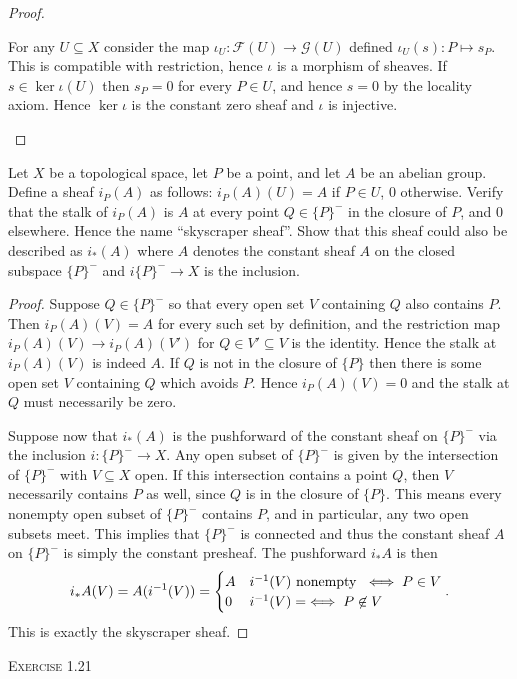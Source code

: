 \begin{problemset}
\begin{proof}
\begin{enumerate}[(a)]
				\medskip

				For any $U\subseteq X$ consider the map $\iota_U:\mathcal F(U)\to \mathcal G(U)$ defined $\iota_U(s): P\mapsto s_P$. This is compatible with restriction, hence $\iota$ is a morphism of sheaves. If $s\in \ker\iota(U)$ then $s_P = 0$ for every $P\in U$, and hence $s = 0$ by the locality axiom. Hence $\ker\iota$ is the constant zero sheaf and $\iota$ is injective.
		\end{enumerate}
	\end{proof}
	\item Let $X$ be a topological space, let $P$ be a point, and let $A$ be an abelian group. Define a sheaf $i_P(A)$ as follows: $i_P(A)(U) = A$ if $P\in U$, $0$ otherwise. Verify that the stalk of $i_P(A)$ is $A$ at every point $Q\in \{P\}^-$ in the closure of $P$, and $0$ elsewhere. Hence the name ``skyscraper sheaf''. Show that this sheaf could also be described as $i_*(A)$ where $A$ denotes the constant sheaf $A$ on the closed subspace $\{P\}^-$ and $i\{P\}^-\to X$ is the inclusion.
	\begin{proof}
		Suppose $Q\in \{P\}^-$ so that every open set $V$ containing $Q$ also contains $P$. Then $i_P(A)(V) = A$ for every such set by definition, and the restriction map $i_P(A)(V) \to i_P(A)(V')$ for $Q \in V' \subseteq V$ is the identity. Hence the stalk at $i_P(A)(V)$ is indeed $A$. If $Q$ is not in the closure of $\{P\}$ then there is some open set $V$ containing $Q$ which avoids $P$. Hence $i_P(A)(V) = 0$ and the stalk at $Q$ must necessarily be zero.

		Suppose now that $i_*(A)$ is the pushforward of the constant sheaf on $\{P\}^-$ via the inclusion $i:\{P\}^-\to X$. Any open subset of $\{P\}^-$ is given by the intersection of $\{P\}^-$ with $V\subseteq X$ open. If this intersection contains a point $Q$, then $V$ necessarily contains $P$ as well, since $Q$ is in the closure of $\{P\}$. This means every nonempty open subset of $\{P\}^-$ contains $P$, and in particular, any two open subsets meet. This implies that $\{P\}^-$ is connected and thus the constant sheaf $A$ on $\{P\}^-$ is simply the constant presheaf. The pushforward $i_*A$ is then
		\begin{align*}
			i_*A(V) = A(i^{-1}(V)) =
			\begin{cases}
				A & i^{-1}(V) \text{ nonempty } \iff P\in V\\
				0 & i^{-1}(V) = \empty \iff P\not\in V
			\end{cases}.
		\end{align*}
		This is exactly the skyscraper sheaf.
	\end{proof}
\item[\textsc{Exercise 1.21}] \label{prob:2_1_21}
\end{problemset}

